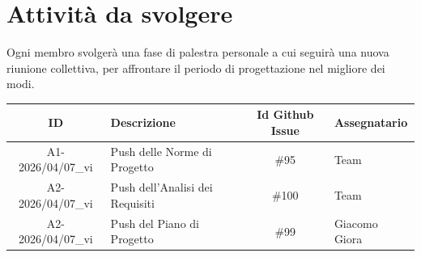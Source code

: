 \documentclass[a4paper,12pt]{article}
\newcommand{\DataVerbale}{2026/04/07}
\begin{document}
\section{Attività da svolgere}{
    Ogni membro svolgerà una fase di palestra personale a cui seguirà una nuova riunione collettiva, per affrontare il periodo di progettazione nel migliore dei modi.
    \begin{center}
        \begin{tabular}{|c|p{4.5cm}|c|p{3cm}|} 
        \hline
        \textbf{ID} & \textbf{Descrizione} & \textbf{Id Github Issue} & \textbf{Assegnatario}\\
        \hline
        A1-\DataVerbale\_vi & Push delle Norme di Progetto & \#95 & Team\\
        \hline
        A2-\DataVerbale\_vi & Push dell'Analisi dei Requisiti & \#100 & Team \\
        \hline
        A2-\DataVerbale\_vi & Push del Piano di Progetto & \#99 & Giacomo Giora\\
        \hline
        \end{tabular}
    \end{center}
}
\end{document}
